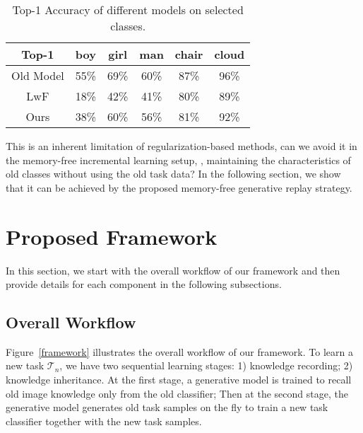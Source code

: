 \documentclass[10pt,twocolumn,letterpaper]{article}
\begin{document}
\begin{table}[t]
\scriptsize
\renewcommand\arraystretch{1.15}
  \begin{center}
    \caption{\small{Top-1 Accuracy of different models on selected classes.}}
    \label{top_1}
    \vspace{-3mm}
    \setlength{\tabcolsep}{3.8mm}
      \begin{tabular}{c |c |c| c| c| c}
      \hline
      Top-1 & boy & girl & man & chair & cloud  \\
      \hline
      \hline
      Old Model &  55\% & 69\% & 60\% & 87\% & 96\%\\
      \hline
      LwF & 18\% & 42\% & 41\% & 80\% & 89\%\\
      \hline
      Ours & 38\% & 60\% & 56\% & 81\% & 92\%\\
      \hline
      \end{tabular}
  \end{center}
  \vspace{-7mm}
\end{table}

This is an inherent limitation of regularization-based methods, can we avoid it in the memory-free incremental learning setup, \ie, maintaining the characteristics of old classes without using the old task data? In the following section, we show that it can be achieved by the proposed memory-free generative replay strategy.

\section{Proposed Framework}
In this section, we start with the overall workflow of our framework and then provide details for each component in the following subsections.

\subsection{Overall Workflow}
Figure~\ref{framework} illustrates the overall workflow of our framework. To learn a new task $\mathcal{T}_n$, we have two sequential learning stages: 1) knowledge recording; 2) knowledge inheritance. At the first stage, a generative model is trained to recall old image knowledge only from the old classifier; Then at the second stage, the generative model generates old task samples on the fly to train a new task classifier together with the new task samples. 
\end{document}

